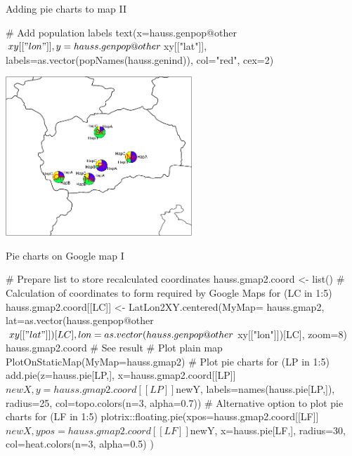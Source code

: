 \documentclass[compress, ucs, xelatex, 11pt, xcolor=svgnames,
  hyperref={
    bookmarks=true,
    unicode=true,
    colorlinks=true,
    pdftitle={Molecular data in R},
    plainpages=false,
    pdfauthor={Vojtech Zeisek},
    pdfsubject={Course about phylogeny and evolution in R},
    pdfcreator={XeLaTeX},
    pdfkeywords={R, evolution, phylogeny, molecular data},
    linkcolor=Tomato,
    anchorcolor=SaddleBrown,
    citecolor=Goldenrod,
    filecolor=DarkMagenta,
    menucolor=Sienna,
    urlcolor=DarkTurquoise,
    pdftex},
  url={hyphens, lowtilde} %
  ]{beamer}
\begin{document}
\begin{frame}[fragile]{Adding pie charts to map II}
  \begin{spluscode}
    # Add population labels
    text(x=hauss.genpop@other$xy[["lon"]], y=hauss.genpop@other$xy[["lat"]],
      labels=as.vector(popNames(hauss.genind)), col="red", cex=2)
  \end{spluscode}
  \begin{center}
    \includegraphics[height=6cm]{map_pie.png}
  \end{center}
\end{frame}

\begin{frame}[fragile]{Pie charts on Google map I}
  \begin{spluscode}
    # Prepare list to store recalculated coordinates
    hauss.gmap2.coord <- list()
    # Calculation of coordinates to form required by Google Maps
    for (LC in 1:5) { hauss.gmap2.coord[[LC]] <- LatLon2XY.centered(MyMap=
      hauss.gmap2, lat=as.vector(hauss.genpop@other$xy[["lat"]])[LC],
      lon=as.vector(hauss.genpop@other$xy[["lon"]])[LC], zoom=8) }
    hauss.gmap2.coord # See result
    # Plot plain map
    PlotOnStaticMap(MyMap=hauss.gmap2)
    # Plot pie charts
    for (LP in 1:5) { add.pie(z=hauss.pie[LP,], x=hauss.gmap2.coord[[LP]]
      $newX, y=hauss.gmap2.coord[[LP]]$newY, labels=names(hauss.pie[LP,]),
      radius=25, col=topo.colors(n=3, alpha=0.7)) }
    # Alternative option to plot pie charts
    for (LF in 1:5) { plotrix::floating.pie(xpos=hauss.gmap2.coord[[LF]]
      $newX, ypos=hauss.gmap2.coord[[LF]]$newY, x=hauss.pie[LF,], radius=30,
      col=heat.colors(n=3, alpha=0.5) ) }
  \end{spluscode}
\end{frame}
\end{document}
